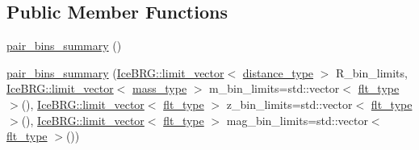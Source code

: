 \subsection*{Public Member Functions}
\begin{DoxyCompactItemize}
\item 
\hyperlink{classIceBRG_1_1pair__bins__summary_adf88b28f6ffab4d0e0aadd8688efd630}{pair\-\_\-bins\-\_\-summary} ()
\item 
\hyperlink{classIceBRG_1_1pair__bins__summary_a27d287757aa70f2017be0daa9e74d6da}{pair\-\_\-bins\-\_\-summary} (\hyperlink{classIceBRG_1_1limit__vector}{Ice\-B\-R\-G\-::limit\-\_\-vector}$<$ \hyperlink{namespaceIceBRG_a45499647eb87e24c10ab32c628711cec}{distance\-\_\-type} $>$ R\-\_\-bin\-\_\-limits, \hyperlink{classIceBRG_1_1limit__vector}{Ice\-B\-R\-G\-::limit\-\_\-vector}$<$ \hyperlink{namespaceIceBRG_a1be72ac4918a9b029f2eefa084213e35}{mass\-\_\-type} $>$ m\-\_\-bin\-\_\-limits=std\-::vector$<$ \hyperlink{lib_2IceBRG__main_2common_8h_ad0f130a56eeb944d9ef2692ee881ecc4}{flt\-\_\-type} $>$(), \hyperlink{classIceBRG_1_1limit__vector}{Ice\-B\-R\-G\-::limit\-\_\-vector}$<$ \hyperlink{lib_2IceBRG__main_2common_8h_ad0f130a56eeb944d9ef2692ee881ecc4}{flt\-\_\-type} $>$ z\-\_\-bin\-\_\-limits=std\-::vector$<$ \hyperlink{lib_2IceBRG__main_2common_8h_ad0f130a56eeb944d9ef2692ee881ecc4}{flt\-\_\-type} $>$(), \hyperlink{classIceBRG_1_1limit__vector}{Ice\-B\-R\-G\-::limit\-\_\-vector}$<$ \hyperlink{lib_2IceBRG__main_2common_8h_ad0f130a56eeb944d9ef2692ee881ecc4}{flt\-\_\-type} $>$ mag\-\_\-bin\-\_\-limits=std\-::vector$<$ \hyperlink{lib_2IceBRG__main_2common_8h_ad0f130a56eeb944d9ef2692ee881ecc4}{flt\-\_\-type} $>$())
\item 

\end{DoxyCompactItemize}
